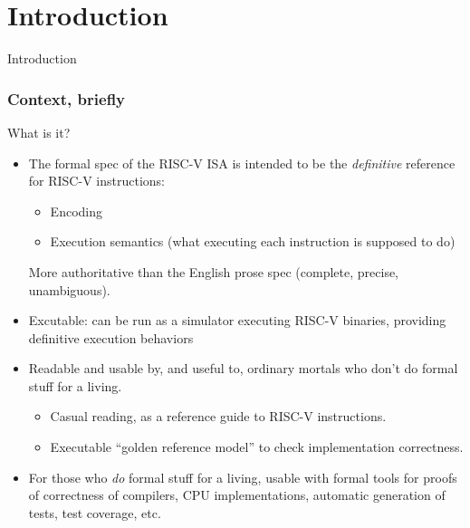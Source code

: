 \documentclass[aspectratio=169]{beamer}
\newcommand{\slidefont}{\scriptsize}
\begin{document}
\section{Introduction}


\begin{frame}[fragile]

  \slidefont

  \vfill

  \begin{center}\LARGE
    Introduction
  \end{center}

  \vfill

\end{frame}


\begin{frame}[fragile]
  \frametitle{Context, briefly}

  \slidefont

  \begin{block}{What is it?}
    \begin{itemize}

      \item The formal spec of the RISC-V ISA is intended to be the
          \emph{definitive} reference for RISC-V instructions:
        \begin{itemize}\slidefont
          \item Encoding
          \item Execution semantics (what executing each instruction is supposed to do)
        \end{itemize}
        More authoritative than the English prose spec (complete, precise, unambiguous).

      \item Excutable: can be run as a simulator executing RISC-V
        binaries, providing definitive execution behaviors

      \item Readable and usable by, and useful to, ordinary mortals who don't do formal stuff for a living.
        \begin{itemize}\slidefont
          \item Casual reading, as a reference guide to RISC-V instructions.
          \item Executable ``golden reference model'' to check implementation correctness.
        \end{itemize}

      \item For those who \emph{do} formal stuff for a living, usable
        with formal tools for proofs of correctness of compilers, CPU
        implementations, automatic generation of tests, test coverage,
        etc.
    \end{itemize}
  \end{block}

\end{frame}
\end{document}
